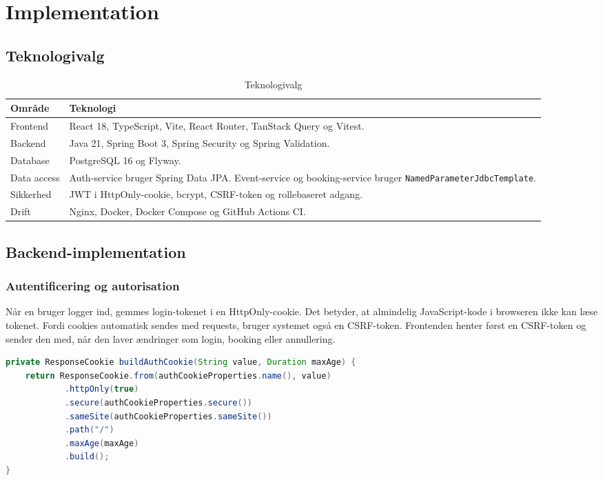 \documentclass[11pt,a4paper]{article}
\newcommand{\code}[1]{\texttt{#1}}
\begin{document}
\section{Implementation}

\subsection{Teknologivalg}

\begin{table}[h]
\centering
\caption{Teknologivalg}
\begin{tabularx}{\textwidth}{@{}L{3.4cm}Y@{}}
\toprule
Område & Teknologi \\
\midrule
Frontend & React 18, TypeScript, Vite, React Router, TanStack Query og Vitest. \\
Backend & Java 21, Spring Boot 3, Spring Security og Spring Validation. \\
Database & PostgreSQL 16 og Flyway. \\
Data access & Auth-service bruger Spring Data JPA. Event-service og booking-service bruger \code{NamedParameterJdbcTemplate}. \\
Sikkerhed & JWT i HttpOnly-cookie, bcrypt, CSRF-token og rollebaseret adgang. \\
Drift & Nginx, Docker, Docker Compose og GitHub Actions CI. \\
\bottomrule
\end{tabularx}
\end{table}

\subsection{Backend-implementation}

\subsubsection{Autentificering og autorisation}

Når en bruger logger ind, gemmes login-tokenet i en HttpOnly-cookie. Det betyder, at almindelig JavaScript-kode i browseren ikke kan læse tokenet. Fordi cookies automatisk sendes med requests, bruger systemet også en CSRF-token. Frontenden henter først en CSRF-token og sender den med, når den laver ændringer som login, booking eller annullering.

\begin{lstlisting}[language=Java,caption={JWT-cookie i auth-service}]
private ResponseCookie buildAuthCookie(String value, Duration maxAge) {
    return ResponseCookie.from(authCookieProperties.name(), value)
            .httpOnly(true)
            .secure(authCookieProperties.secure())
            .sameSite(authCookieProperties.sameSite())
            .path("/")
            .maxAge(maxAge)
            .build();
}
\end{lstlisting}
\end{document}
